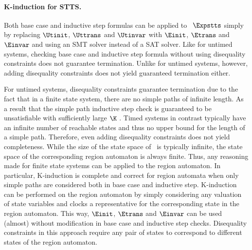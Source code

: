 \paragraph{K-induction for STTS.} Both base case and inductive step formulas can be applied to \aExpsttsTerm\ $\Expstts$ simply by replacing $\Utinit$, $\Uttrans$ and $\Utinvar$ with $\Einit$, $\Etrans$ and $\Einvar$ and using an SMT solver instead of a SAT solver. Like for untimed systems, checking base case and inductive step formula without using disequality constraints does not guarantee termination. Unlike for untimed systems, however, adding disequality constraints does not yield guaranteed termination either.

For untimed systems, disequality constraints guarantee termination due to the fact that in a finite state system, there are no simple paths of infinite length. As a result that the simple path inductive step check is guaranteed to be unsatisfiable with sufficiently large $\K$ \tocite. Timed systems in contrast typically have an infinite number of reachable states and thus no upper bound for the length of a simple path. Therefore, even adding disequality constraints does not yield completeness.
While the size of the state space of \aExpsttsTerm\ is typically infinite, the state space of the corresponding region automaton is always finite. Thus, any reasoning made for finite state systems can be applied to the region automaton. In particular, K-induction is complete and correct for region automata when only simple paths are considered both in base case and inductive step.
K-induction can be performed on the region automaton by simply considering any valuation of state variables and clocks a representative for the corresponding state in the region automaton. This way, $\Einit$, $\Etrans$ and $\Einvar$ can be used (almost) without modification in base case and inductive step checks. Disequality constraints in this approach require any pair of states to correspond to different states of the region automaton.

